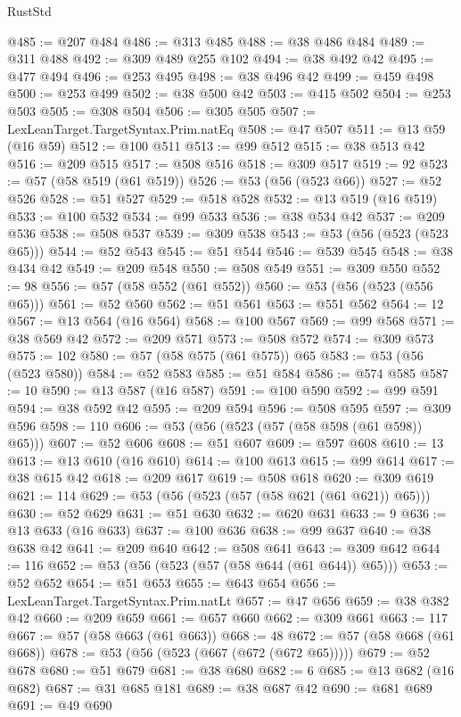 \begin{lexlean}{RustStd}
\begin{coremodule}
@485 := @207 @484
@486 := @313 @485
@488 := @38 @486 @484
@489 := @311 @488
@492 := @309 @489 @255 @102
@494 := @38 @492 @42
@495 := @477 @494
@496 := @253 @495
@498 := @38 @496 @42
@499 := @459 @498
@500 := @253 @499
@502 := @38 @500 @42
@503 := @415 @502
@504 := @253 @503
@505 := @308 @504
@506 := @305 @505
@507 := LexLeanTarget.TargetSyntax.Prim.natEq
@508 := @47 @507
@511 := @13 @59 (@16 @59)
@512 := @100 @511
@513 := @99 @512
@515 := @38 @513 @42
@516 := @209 @515
@517 := @508 @516
@518 := @309 @517
@519 := 92
@523 := @57 (@58 @519 (@61 @519))
@526 := @53 (@56 (@523 @66))
@527 := @52 @526
@528 := @51 @527
@529 := @518 @528
@532 := @13 @519 (@16 @519)
@533 := @100 @532
@534 := @99 @533
@536 := @38 @534 @42
@537 := @209 @536
@538 := @508 @537
@539 := @309 @538
@543 := @53 (@56 (@523 (@523 @65)))
@544 := @52 @543
@545 := @51 @544
@546 := @539 @545
@548 := @38 @434 @42
@549 := @209 @548
@550 := @508 @549
@551 := @309 @550
@552 := 98
@556 := @57 (@58 @552 (@61 @552))
@560 := @53 (@56 (@523 (@556 @65)))
@561 := @52 @560
@562 := @51 @561
@563 := @551 @562
@564 := 12
@567 := @13 @564 (@16 @564)
@568 := @100 @567
@569 := @99 @568
@571 := @38 @569 @42
@572 := @209 @571
@573 := @508 @572
@574 := @309 @573
@575 := 102
@580 := @57 (@58 @575 (@61 @575)) @65
@583 := @53 (@56 (@523 @580))
@584 := @52 @583
@585 := @51 @584
@586 := @574 @585
@587 := 10
@590 := @13 @587 (@16 @587)
@591 := @100 @590
@592 := @99 @591
@594 := @38 @592 @42
@595 := @209 @594
@596 := @508 @595
@597 := @309 @596
@598 := 110
@606 := @53 (@56 (@523 (@57 (@58 @598 (@61 @598)) @65)))
@607 := @52 @606
@608 := @51 @607
@609 := @597 @608
@610 := 13
@613 := @13 @610 (@16 @610)
@614 := @100 @613
@615 := @99 @614
@617 := @38 @615 @42
@618 := @209 @617
@619 := @508 @618
@620 := @309 @619
@621 := 114
@629 := @53 (@56 (@523 (@57 (@58 @621 (@61 @621)) @65)))
@630 := @52 @629
@631 := @51 @630
@632 := @620 @631
@633 := 9
@636 := @13 @633 (@16 @633)
@637 := @100 @636
@638 := @99 @637
@640 := @38 @638 @42
@641 := @209 @640
@642 := @508 @641
@643 := @309 @642
@644 := 116
@652 := @53 (@56 (@523 (@57 (@58 @644 (@61 @644)) @65)))
@653 := @52 @652
@654 := @51 @653
@655 := @643 @654
@656 := LexLeanTarget.TargetSyntax.Prim.natLt
@657 := @47 @656
@659 := @38 @382 @42
@660 := @209 @659
@661 := @657 @660
@662 := @309 @661
@663 := 117
@667 := @57 (@58 @663 (@61 @663))
@668 := 48
@672 := @57 (@58 @668 (@61 @668))
@678 := @53 (@56 (@523 (@667 (@672 (@672 @65)))))
@679 := @52 @678
@680 := @51 @679
@681 := @38 @680
@682 := 6
@685 := @13 @682 (@16 @682)
@687 := @31 @685 @181
@689 := @38 @687 @42
@690 := @681 @689
@691 := @49 @690

\end{coremodule}
\end{lexlean}
